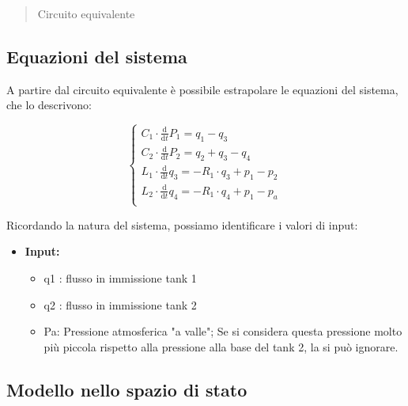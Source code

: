 \documentclass[
]{article}
\begin{document}
\begin{quote}
Circuito equivalente
\end{quote}


\hypertarget{equazioni-del-sistema}{%
\subsection{Equazioni del sistema}\label{equazioni-del-sistema}}

A partire dal circuito equivalente è possibile estrapolare le equazioni
del sistema, che lo descrivono:

\begin{equation}
    \begin{cases}
      C_{1} \cdot \frac{\mathrm{d} }{\mathrm{d} t}P_{1} = q_{1} - q_{3}\\
      C_{2} \cdot \frac{\mathrm{d} }{\mathrm{d} t}P_{2} = q_{2} + q_{3} - q_{4}\\
      L_{1} \cdot \frac{\mathrm{d} }{\mathrm{d} t}q_{3} = -R_{1} \cdot q_{3} + p_{1} - p_{2}\\
      L_{2} \cdot \frac{\mathrm{d} }{\mathrm{d} t}q_{4} = -R_{1} \cdot q_{4} + p_{1} - p_{a}\\

    \end{cases}\,
\end{equation}
\newpage

Ricordando la natura del sistema, possiamo identificare i valori di
input:

\begin{itemize}
\item
  \textbf{Input:}

  \begin{itemize}
  \item
    q1 : flusso in immissione tank 1
  \item
    q2 : flusso in immissione tank 2
  \item
    Pa: Pressione atmosferica "a valle"; Se si considera questa
    pressione molto più piccola rispetto alla pressione alla base del
    tank 2, la si può ignorare.
  \end{itemize}
\end{itemize}

\hypertarget{modello-nello-spazio-di-stato}{%
\subsection{Modello nello spazio di
stato}\label{modello-nello-spazio-di-stato}}
\end{document}
